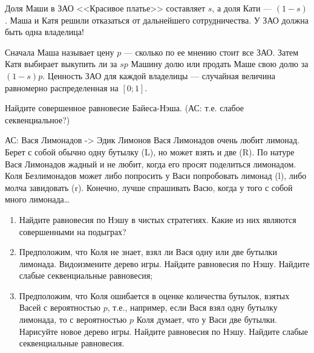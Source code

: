 \begin{problem}
Доля Маши в ЗАО <<Красивое платье>> составляет  $s$, а доля Кати ---  $\left(1-s\right)$. Маша и Катя решили отказаться от дальнейшего сотрудничества. У ЗАО должна быть одна владелица!\par
Сначала Маша называет цену  $p$  --- сколько по ее мнению стоит все ЗАО. Затем Катя выбирает выкупить ли за  $sp$  Машину долю или продать Маше свою долю за  $\left(1-s\right)p$.
Ценность ЗАО для каждой владелицы --- случайная величина равномерно распределенная на  $\left[0;1\right]$.\par
Найдите совершенное равновесие Байеса-Нэша. ({\red АС: т.е. слабое секвенциальное?})\par



\begin{sol}

\end{sol}
\end{problem}





\begin{problem}
{\red АС: Вася Лимонадов -> Эдик Лимонов}
Вася Лимонадов очень любит лимонад. Берет с собой обычно одну бутылку (L), но может взять и две (R). По натуре Вася Лимонадов жадный и не любит, когда его просят поделиться лимонадом. Коля Безлимонадов может либо попросить у Васи попробовать лимонад (l), либо молча завидовать (r). Конечно, лучше спрашивать Васю, когда у того с собой много лимонада\ldots \par
{}

\begin{enumerate}
\item Найдите равновесия по Нэшу в чистых стратегиях. Какие из них являются совершенными на подыграх?\par
\item Предположим, что Коля не знает, взял ли Вася одну или две бутылки лимонада. Видоизмените дерево игры. Найдите равновесия по Нэшу. Найдите слабые секвенциальные равновесия;\par
\item  Предположим, что Коля ошибается в оценке количества бутылок, взятых Васей с вероятностью  $p$, т.е., например, если Вася взял одну бутылку лимонада, то с вероятностью  $p$  Коля думает, что у Васи две бутылки. Нарисуйте новое дерево игры. Найдите равновесия по Нэшу. Найдите слабые секвенциальные равновесия.\par
\end{enumerate}


\begin{sol}

\end{sol}
\end{problem}



